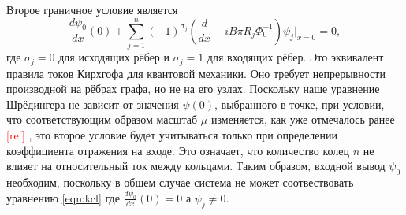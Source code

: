 \documentclass[A4,12pt,oneside]{article}
\renewcommand{\(}{\left(}
\renewcommand{\)}{\right)}
\newcommand{\citeph}{\textcolor{red}{[ref] }}
\begin{document}
Второе граничное условие является
\begin{equation}\label{eqn:kcl}
\frac{d\psi_0}{d x}\left(0\right) + \sum_{j=1}^n \left(-1\right)^{\sigma_j}\left(\frac{d}{dx}-iB\pi R_j \Phi_0^{-1}\right)\psi_j | _{x=0}= 0,
\end{equation}
где $\sigma_j = 0$ для исходящих рёбер и $\sigma_j = 1$ для входящих рёбер.
Это эквивалент правила токов Кирхгофа для квантовой механики. Оно требует непрерывности производной на рёбрах графа, но не на его узлах.  
Поскольку наше уравнение Шрёдингера не зависит от значения $\psi\left(0\right)$, выбранного в точке, при условии, что соответствующим образом масштаб $\mu$ изменяется, как уже отмечалось ранее \citeph, это второе условие будет учитываться только при определении коэффициента отражения на входе. Это означает, что количество колец $n$ не влияет на относительный ток между кольцами. Таким образом, входной вывод $\psi_0$ необходим, поскольку в общем случае система не может соотвествовать уравнению
\ref{eqn:kcl} где $\frac{d\psi_0}{dx}\left(0\right) = 0$ а $\psi_j \neq 0$.
\end{document}
